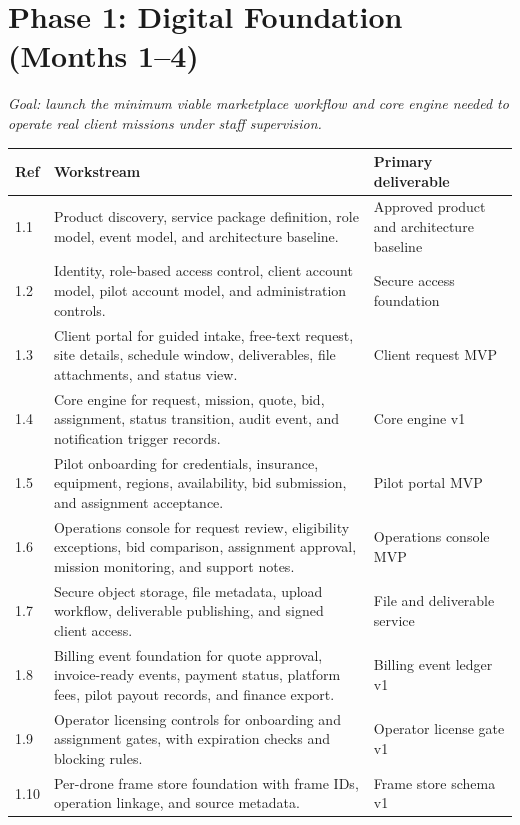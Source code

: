\documentclass[11pt,a4paper]{article}
\begin{document}
\section{Phase 1: Digital Foundation (Months 1--4)}

\textit{Goal: launch the minimum viable marketplace workflow and core engine needed to operate real client missions under staff supervision.}

\begin{longtable}{p{}p{}p{}}
\toprule
\textbf{Ref} & \textbf{Workstream} & \textbf{Primary deliverable} \\
\midrule
1.1 & Product discovery, service package definition, role model, event model, and architecture baseline. & Approved product and architecture baseline \\
1.2 & Identity, role-based access control, client account model, pilot account model, and administration controls. & Secure access foundation \\
1.3 & Client portal for guided intake, free-text request, site details, schedule window, deliverables, file attachments, and status view. & Client request MVP \\
1.4 & Core engine for request, mission, quote, bid, assignment, status transition, audit event, and notification trigger records. & Core engine v1 \\
1.5 & Pilot onboarding for credentials, insurance, equipment, regions, availability, bid submission, and assignment acceptance. & Pilot portal MVP \\
1.6 & Operations console for request review, eligibility exceptions, bid comparison, assignment approval, mission monitoring, and support notes. & Operations console MVP \\
1.7 & Secure object storage, file metadata, upload workflow, deliverable publishing, and signed client access. & File and deliverable service \\
1.8 & Billing event foundation for quote approval, invoice-ready events, payment status, platform fees, pilot payout records, and finance export. & Billing event ledger v1 \\
1.9 & Operator licensing controls for onboarding and assignment gates, with expiration checks and blocking rules. & Operator license gate v1 \\
1.10 & Per-drone frame store foundation with frame IDs, operation linkage, and source metadata. & Frame store schema v1 \\
\bottomrule
\end{longtable}
\end{document}
